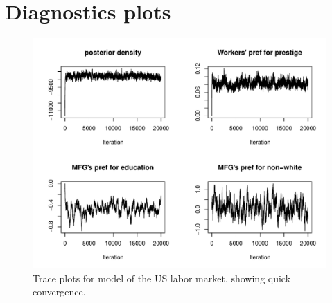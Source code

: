 \chapter{Diagnostics plots}
\label{chap:diagnostics_plots}

\begin{figure}[tbp]
  \centering
  \includegraphics[width=\textwidth,keepaspectratio]{../figure/labor_occ5_misc_traceplots}
  \caption[Traceplots showing quick convergence for model of the US labor
  market.]{Trace plots for model of the US labor market, showing quick convergence.}
  \label{fig:labor_occ5_misc_traceplots}
\end{figure}

